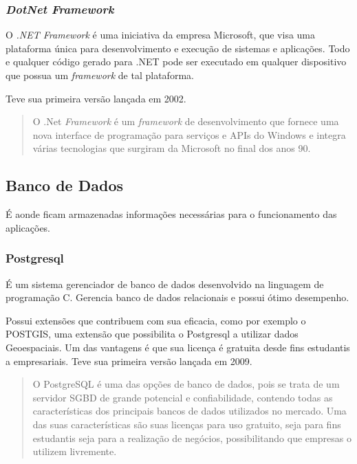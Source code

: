 \subsubsection{\textit{DotNet Framework}}

O \textit{.NET Framework} é uma iniciativa da empresa Microsoft, que visa uma plataforma única para desenvolvimento e execução de sistemas e aplicações.
Todo e qualquer código gerado para .NET pode ser executado em qualquer dispositivo que possua um \textit{framework} de tal plataforma.

Teve sua primeira versão lançada em 2002.

\begin{quote}
  
O .Net \textit{Framework} é um \textit{framework} de desenvolvimento que fornece uma nova interface de programação para serviços e APIs do Windows e integra várias tecnologias que surgiram da Microsoft no final dos anos 90. \cite{thai2003net}
\end{quote}

\subsection{Banco de Dados}

É aonde ficam armazenadas informações necessárias para o funcionamento das aplicações.

\subsubsection{Postgresql}

É um sistema gerenciador de banco de dados desenvolvido na linguagem de programação C.
Gerencia banco de dados relacionais e possui ótimo desempenho.

Possui extensões que contribuem com sua eficacia, como por exemplo o POSTGIS, uma extensão que possibilita o Postgresql a utilizar dados Geoespaciais.
Um das vantagens é que sua licença é gratuita desde fins estudantis a empresariais.
Teve sua primeira versão lançada em 2009.

\begin{quote}
  O PostgreSQL é uma das opções de banco de dados, pois se trata de um servidor SGBD de grande potencial e confiabilidade, contendo todas as características dos principais bancos de dados utilizados no mercado. Uma das suas características são suas licenças para uso gratuito, seja para fins estudantis seja para a realização de negócios, possibilitando que empresas o utilizem livremente. \cite{postgres}
\end{quote}

